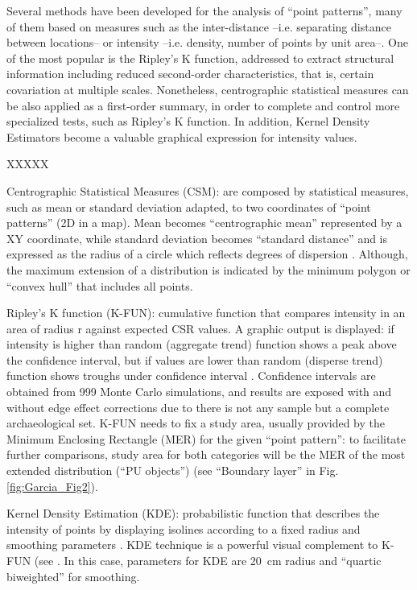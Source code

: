Several methods have been developed for the analysis of “point patterns”, many of them based on measures such as the inter-distance –i.e. separating distance between locations– or intensity –i.e. density, number of points by unit area–. One of the most popular is the Ripley’s K function, addressed to extract structural information including reduced second-order characteristics, that is, certain covariation at multiple scales. Nonetheless, centrographic statistical measures can be also applied as a first-order summary, in order to complete and control more specialized tests, such as Ripley’s K function. In addition, Kernel Density Estimators become a valuable graphical expression for intensity values.

\begin{labeling}{XXXXX}
\item[Centrographic Statistical Measures (CSM):] are composed by statistical measures, such as mean or standard deviation adapted, to two coordinates of “point patterns” (2D in a map). Mean becomes “centrographic mean” represented by a XY coordinate, while standard deviation becomes “standard distance” and is expressed as the radius of a circle which reflects degrees of dispersion \parencites{Ebdon_1985}{Wong_2005}. Although, the maximum extension of a distribution is indicated by the minimum polygon or “convex hull” that includes all points.
	
\item[Ripley’s K function (K-FUN):] cumulative function that compares intensity in an area of radius r against expected CSR values. A graphic output is displayed: if intensity is higher than random (aggregate trend) function shows a peak above the confidence interval, but if values are lower than random (disperse trend) function shows troughs under confidence interval \parencites{Orton_2004}{Wong_2005}. Confidence intervals are obtained from \num{999} Monte Carlo simulations, and results are exposed with and without edge effect corrections due to there is not any sample but a complete archaeological set. K-FUN needs to fix a study area, usually provided by the Minimum Enclosing Rectangle (MER) for the given “point pattern”: to facilitate further comparisons, study area for both categories will be the MER of the most extended distribution (“PU objects”) (see “Boundary layer” in Fig. \ref{fig:Garcia_Fig2}).

\item[Kernel Density Estimation (KDE):] probabilistic function that describes the intensity of points by displaying isolines according to a fixed radius and smoothing parameters \parencite{Baxter_1997}. KDE technique is a powerful visual complement to K-FUN (see \parencite[see][]{Sayer_2013}. In this case, parameters for KDE are \SI{20}{\centi\meter} radius and “quartic biweighted” for smoothing.


\end{labeling}
